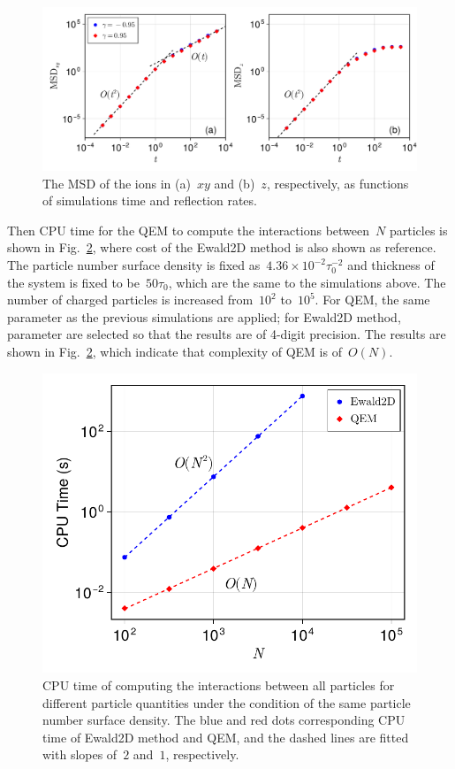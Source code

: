 \begin{figure}[htbp]
    \centering
    \includegraphics[width = 1.0 \linewidth]{figs/msd.pdf}
    \caption{
        The MSD of the ions in (a)~$xy$ and (b)~$z$, respectively, as functions of simulations time and reflection rates.
    }
    \label{fig:msd}
\end{figure}

Then CPU time for the QEM to compute the interactions between~$N$ particles is shown in Fig.~\ref{fig:timecost}, where cost of the Ewald2D method is also shown as reference.
The particle number surface density is fixed as~$4.36 \times 10^{-2} \tau_0^{-2}$ and thickness of the system is fixed to be~$50 \tau_0$, which are the same to the simulations above.
The number of charged particles is increased from~$10^2$ to~$10^5$.
For QEM, the same parameter as the previous simulations are applied; for Ewald2D method, parameter are selected so that the results are of 4-digit precision.
The results are shown in Fig.~\ref{fig:timecost}, which indicate that complexity of QEM is of~$O(N)$.

\begin{figure}[htb]
    \centering
    \includegraphics[width = 0.625\linewidth]{figs/runtime.pdf}
    \caption{
    CPU time of computing the interactions between all particles for different particle quantities under the condition of the same particle number surface density.
    The blue and red dots corresponding CPU time of Ewald2D method and QEM, and the dashed lines are fitted with slopes of~$2$ and~$1$, respectively.
    }
    \label{fig:timecost}
\end{figure}

